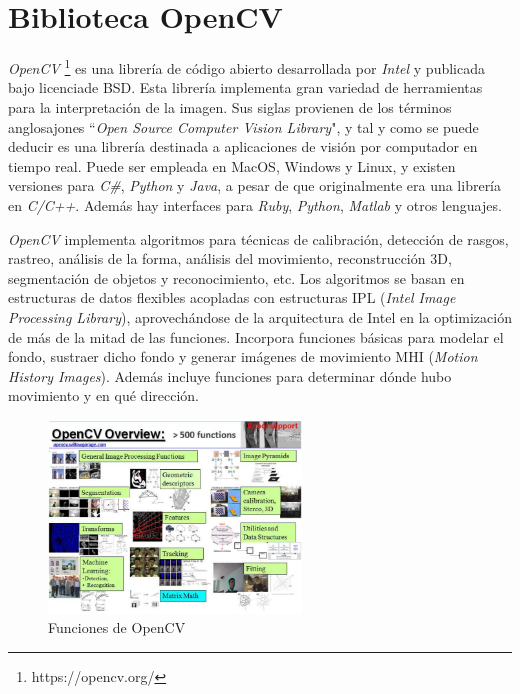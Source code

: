 \section{Biblioteca OpenCV}

\textit{OpenCV} \footnote{https://opencv.org/} es una librería de código abierto desarrollada por \textit{Intel} y publicada  bajo licenciade BSD. Esta librería implementa gran variedad de herramientas para la interpretación de la imagen. Sus  siglas  provienen  de  los  términos anglosajones ``\textit{Open Source Computer  Vision Library}", y tal y como se puede deducir es una librería destinada a aplicaciones de visión por computador en tiempo real. Puede ser empleada en MacOS, Windows y Linux, y existen versiones para \textit{C\#}, \textit{Python} y \textit{Java}, a pesar de que originalmente era una librería en \textit{C/C++}. Además hay interfaces para \textit{Ruby}, \textit{Python}, \textit{Matlab} y otros lenguajes. 

\textit{OpenCV} implementa algoritmos para técnicas de calibración, detección de rasgos, rastreo, análisis de la forma, análisis del movimiento, reconstrucción 3D, segmentación de objetos y reconocimiento, etc. Los algoritmos se basan  en  estructuras de datos flexibles acopladas con estructuras IPL (\textit{Intel  Image Processing Library}), aprovechándose de la arquitectura de Intel en la optimización de más de la mitad de las funciones. Incorpora funciones básicas para modelar el fondo, sustraer dicho  fondo y generar imágenes de movimiento MHI  (\textit{Motion  History  Images}).  Además  incluye  funciones para determinar dónde hubo movimiento y en qué dirección. 

\begin{figure}[H]
  \begin{center}
    \includegraphics[width=0.6\textwidth]{figures/Herramientas/opencv.png}
		\caption{Funciones de OpenCV}
		\label{fig.opencv}
		\end{center}
\end{figure}


